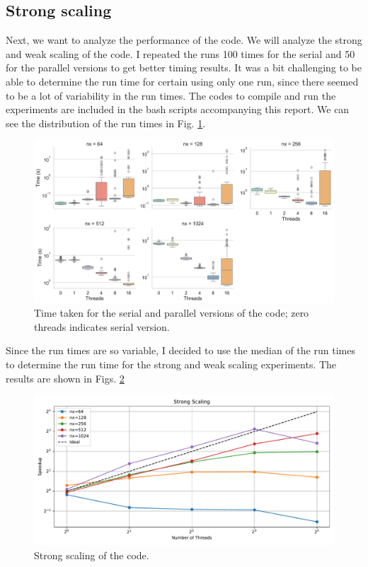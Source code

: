 \documentclass[unicode,11pt,a4paper,oneside,numbers=endperiod,openany]{scrartcl}
\begin{document}
\subsection*{Strong scaling}
Next, we want to analyze the performance of the code. We will analyze the strong
and weak scaling of the code. I repeated the runs 100 times for the serial and
50 for the parallel
versions to get better timing results.
It was a bit challenging to be able to determine the run time for certain using
only one run, since there seemed to be a lot of variability in the run times.
The codes to compile and run the experiments are included in the bash scripts
accompanying this report. We can see the distribution of the run times in Fig. \ref{im:times}.
\begin{figure}
    \centering
    \includegraphics[width=\textwidth]{../mini_app/data_var.pdf}
    \caption{Time taken for the serial and parallel versions of the code; zero threads indicates serial version.}
    \label{im:times}
\end{figure}
Since the run times are so variable, I decided to use the median of the run
times
to determine the run time for the strong and weak scaling experiments. The
results
are shown in Figs. \ref{im:strong_scaling}
\begin{figure}
    \centering
    \includegraphics[width=\textwidth]{../mini_app/strong_scaling_plot.pdf}
    \caption{Strong scaling of the code.}
    \label{im:strong_scaling}
\end{figure}
\end{document}
